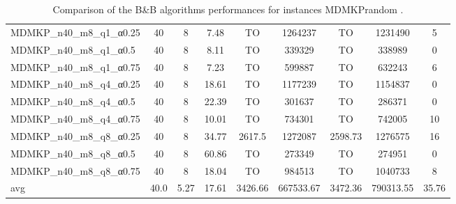 \begin{table}[!ht]
{\begin{tabular}{lcccccccc}
MDMKP\_n40\_m8\_q1\_α0.25 & 40 & 8 &  \textcolor{blue2}{7.48} & TO & 1264237 & TO & 1231490 & 5 \\
MDMKP\_n40\_m8\_q1\_α0.5 & 40 & 8 &  \textcolor{blue2}{8.11} & TO & 339329 & TO & 338989 & 0 \\
MDMKP\_n40\_m8\_q1\_α0.75 & 40 & 8 &  \textcolor{blue2}{7.23} & TO & 599887 & TO & 632243 & 6 \\
MDMKP\_n40\_m8\_q4\_α0.25 & 40 & 8 &  \textcolor{blue2}{18.61} & TO & 1177239 & TO & 1154837 & 0 \\
MDMKP\_n40\_m8\_q4\_α0.5 & 40 & 8 &  \textcolor{blue2}{22.39} & TO & 301637 & TO & 286371 & 0 \\
MDMKP\_n40\_m8\_q4\_α0.75 & 40 & 8 &  \textcolor{blue2}{10.01} & TO & 734301 & TO & 742005 & 10 \\
MDMKP\_n40\_m8\_q8\_α0.25 & 40 & 8 &  \textcolor{blue2}{34.77} & 2617.5 & 1272087 & 2598.73 & 1276575 & 16 \\
MDMKP\_n40\_m8\_q8\_α0.5 & 40 & 8 &  \textcolor{blue2}{60.86} & TO & 273349 & TO & 274951 & 0 \\
MDMKP\_n40\_m8\_q8\_α0.75 & 40 & 8 &  \textcolor{blue2}{18.04} & TO & 984513 & TO & 1040733 & 8 \\
\cline{1-9} avg & 40.0 & 5.27 & 17.61 & 3426.66& 667533.67 & 3472.36& 790313.55 & 35.76\\ \cline{1-9}
\bottomrule
\end{tabular}
}%
\caption{Comparison of the B\&B algorithms performances for instances MDMKPrandom .}
\label{tab:table_EPSILONvsBBvsEPBBB_MDMKPrandom }
\end{table}
